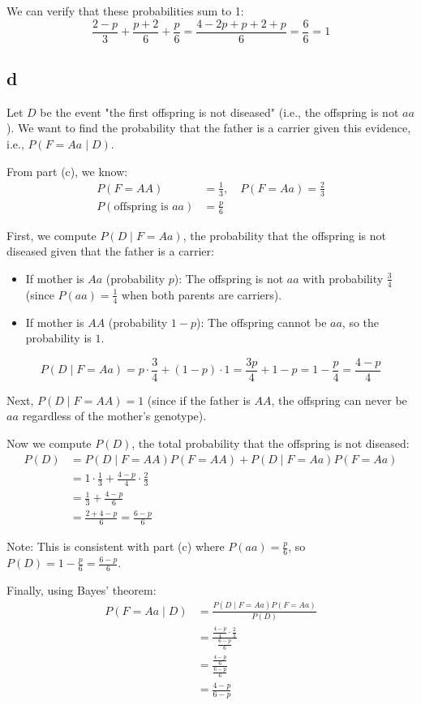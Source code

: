 \documentclass[a4paper, UTF-8]{article}
\theoremstyle{plain}
\begin{document}
We can verify that these probabilities sum to 1:
\[
\frac{2-p}{3} + \frac{p+2}{6} + \frac{p}{6} = \frac{4-2p+p+2+p}{6} = \frac{6}{6} = 1
\]

\subsection{d}

Let $D$ be the event "the first offspring is not diseased" (i.e., the offspring is not $aa$). We want to find the probability that the father is a carrier given this evidence, i.e., $P(F = Aa \mid D)$.

From part (c), we know:
\begin{align*}
P(F = AA) &= \frac{1}{3}, \quad P(F = Aa) = \frac{2}{3} \\
P(\text{offspring is } aa) &= \frac{p}{6}
\end{align*}

First, we compute $P(D \mid F = Aa)$, the probability that the offspring is not diseased given that the father is a carrier:
\begin{itemize}
    \item If mother is $Aa$ (probability $p$): The offspring is not $aa$ with probability $\frac{3}{4}$ (since $P(aa) = \frac{1}{4}$ when both parents are carriers).
    \item If mother is $AA$ (probability $1-p$): The offspring cannot be $aa$, so the probability is $1$.
\end{itemize}
\[
P(D \mid F = Aa) = p \cdot \frac{3}{4} + (1-p) \cdot 1 = \frac{3p}{4} + 1 - p = 1 - \frac{p}{4} = \frac{4-p}{4}
\]

Next, $P(D \mid F = AA) = 1$ (since if the father is $AA$, the offspring can never be $aa$ regardless of the mother's genotype).

Now we compute $P(D)$, the total probability that the offspring is not diseased:
\begin{align*}
P(D) &= P(D \mid F = AA)P(F = AA) + P(D \mid F = Aa)P(F = Aa) \\
&= 1 \cdot \frac{1}{3} + \frac{4-p}{4} \cdot \frac{2}{3} \\
&= \frac{1}{3} + \frac{4-p}{6} \\
&= \frac{2 + 4 - p}{6} = \frac{6-p}{6}
\end{align*}

Note: This is consistent with part (c) where $P(aa) = \frac{p}{6}$, so $P(D) = 1 - \frac{p}{6} = \frac{6-p}{6}$.

Finally, using Bayes' theorem:
\begin{align*}
P(F = Aa \mid D) &= \frac{P(D \mid F = Aa)P(F = Aa)}{P(D)} \\
&= \frac{\frac{4-p}{4} \cdot \frac{2}{3}}{\frac{6-p}{6}} \\
&= \frac{\frac{4-p}{6}}{\frac{6-p}{6}} \\
&= \frac{4-p}{6-p}
\end{align*}
\end{document}
